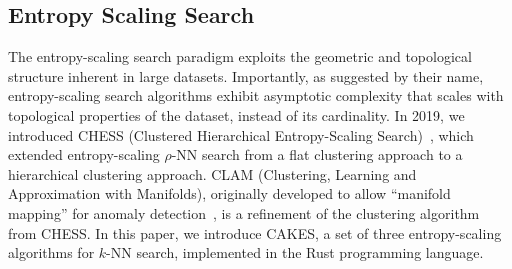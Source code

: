 \subsection{Entropy Scaling Search}
\label{sec:intoduction:entropy-scaling-search}

The entropy-scaling search paradigm exploits the geometric and topological structure inherent in large datasets.
Importantly, as suggested by their name, entropy-scaling search algorithms exhibit asymptotic complexity that scales with topological properties of the dataset, instead of its cardinality.
In 2019, we introduced CHESS (Clustered Hierarchical Entropy-Scaling Search)~\cite{ishaq2019clustered}, which extended entropy-scaling $\rho$-NN search from a flat clustering approach to a hierarchical clustering approach.
CLAM (Clustering, Learning and Approximation with Manifolds), originally developed to allow ``manifold mapping'' for anomaly detection~\cite{ishaq2021clustered}, is a refinement of the clustering algorithm from CHESS.
In this paper, we introduce CAKES, a set of three entropy-scaling algorithms for $k$-NN search, implemented in the Rust programming language.
